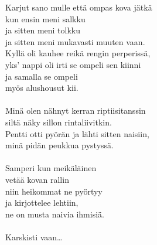             Karjut sano mulle että ompas kova jätkä \\
            kun ensin meni salkku  \\
            ja sitten meni tolkku \\
            ja sitten meni mukavasti muuten vaan. \\
            Kyllä oli kauhee reikä rengin perperissä, \\
            yks’ nappi oli irti se ompeli sen kiinni \\
            ja samalla se ompeli  \\
            myös alushousut kii. \\
\hspace{10mm} \\
            Minä olen nähnyt kerran riptiisitanssin \\
            siltä näky sillon rintaliivitkin. \\
            Pentti otti pyörän ja lähti sitten naisiin, \\
            minä pidän peukkua pystyssä. \\
\hspace{10mm} \\
            Samperi kun meikäläinen  \\
            vetää kovan rallin \\
            niin heikommat ne pyörtyy  \\
            ja kirjottelee lehtiin, \\
            ne on musta naivia ihmisiä. \\
\hspace{10mm} \\
            Karskisti vaan… \\
